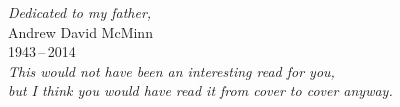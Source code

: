 
\thispagestyle{empty}

\vspace*{3cm}

\begin{center}
\emph{\small Dedicated to my father,} \\Andrew David McMinn \\
\small 1943\,--\,2014\\
\smallskip
\bigskip
\emph{\small This would not have been an interesting read for you,\\
but I think you would have read it from cover to cover anyway.} \\
\end{center}